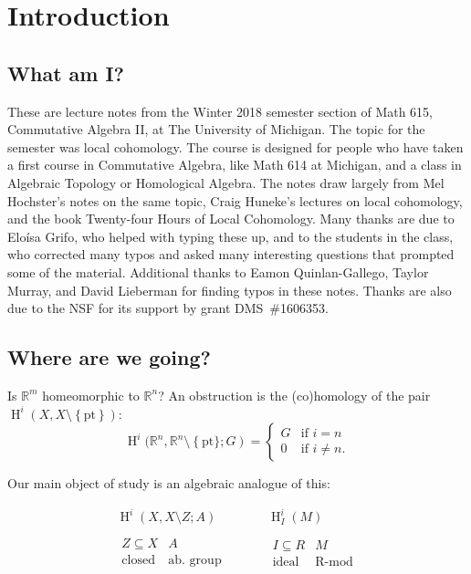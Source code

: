 \documentclass[11pt]{book}
\numberwithin{equation}{section}
\numberwithin{theorem}{chapter}
\theoremstyle{definition}
\newtheorem*{basic properties}{Basic Properties}
\newtheorem*{Important Remark}{Important Remark}
\theoremstyle{remark}
\renewcommand{\H}{\operatorname{H}}
\begin{document}
\tableofcontents

\setcounter{chapter}{-1}
\chapter{Introduction}

\section{What am I?}

These are lecture notes from the Winter 2018 semester section of Math 615, Commutative Algebra II, at The University of Michigan. The topic for the semester was local cohomology. The course is designed for people who have taken a first course in Commutative Algebra, like Math 614 at Michigan, and a class in Algebraic Topology or Homological Algebra. The notes draw largely from Mel Hochster's notes on the same topic, Craig Huneke's lectures on local cohomology, and the book Twenty-four Hours of Local Cohomology. Many thanks are due to Elo\'isa Grifo, who helped with typing these up, and to the students in the class, who corrected many typos and asked many interesting questions that prompted some of the material. Additional thanks to Eamon Quinlan-Gallego, Taylor Murray, and David Lieberman for finding typos in these notes. Thanks are also due to the NSF for its support by grant DMS~\#1606353.

\section{Where are we going?}

Is $\mathbb{R}^m$ homeomorphic to $\mathbb{R}^n$? An obstruction is the (co)homology of the pair $\H^i(X,X \setminus \left\lbrace \textrm{pt} \right\rbrace)$:
$$\H^i(\mathbb{R}^n, \mathbb{R}^n \setminus \left\lbrace \textrm{pt}\rbrace ; G \right) = \left\lbrace \begin{array}{ll} G & \textrm{if } i=n \\ 0 & \textrm{if } i \neq n. \end{array} \right.$$

Our main object of study is an algebraic analogue of this:


$$\begin{array}{ccccccc}
\H^i(X,X \setminus  Z; A ) &&&& \H^i_I(M) \\
& \\
\begin{array}{cc} Z \subseteq X & A \\ \textrm{closed} & \textrm{ab. group} \end{array} 
&&&&
\begin{array}{cc} I \subseteq R & M \\ \textrm{ideal} & \textrm{R-mod} \end{array} \\
\end{array}$$
\end{document}
